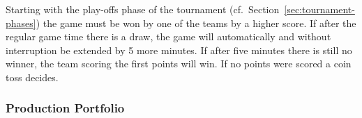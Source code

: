 \documentclass[12pt,twoside]{article}
\newcommand{\refsec}[1]{Section~\ref{#1}}
\begin{document}
Starting with the play-offs phase of the tournament
(cf.~\refsec{sec:tournament-phases}) the game must be won by one of
the teams by a higher score. If after the regular game time there is a
draw, the game will automatically and without interruption be extended
by 5 more minutes. If after five minutes there is still no winner, the
team scoring the first points will win. If no points were scored a
coin toss decides.

\subsubsection{Production Portfolio}
\label{sec:production-portfolio}
\begin{figure}
\end{figure}
\end{document}
